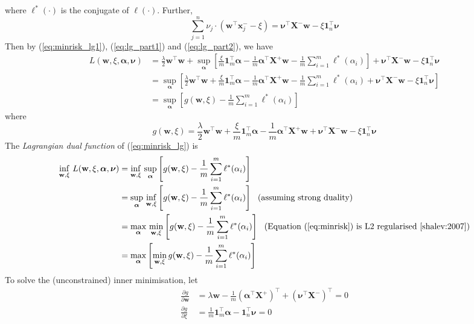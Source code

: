 \documentclass[9pt]{extarticle}
\newcommand{\x}{\mathbf{x}}
\newcommand{\1}{\mathbf{1}}
\newcommand{\w}{\mathbf{w}}
\newcommand{\X}{\mathbf{X}}
\newcommand{\alphabm}{\bm{\alpha}}
\newcommand{\nubm}{\bm{\nu}}
\begin{document}
where $\ell^*(\cdot)$ is the conjugate of $\ell(\cdot)$.
Further, 
\begin{equation}
\label{eq:lg_part2}
\sum_{j=1}^n \nu_j \cdot \left( \w^\top \x_j^- - \xi \right) = \nubm^\top \X^- \w - \xi \1_n^\top \nubm
\end{equation}
Then by (\ref{eq:minrisk_lg1}), (\ref{eq:lg_part1}) and (\ref{eq:lg_part2}), we have
\begin{align*}
L(\w, \xi, \alphabm, \nubm) 
&= \frac{\lambda}{2} \w^\top \w + 
   \sup_{\alphabm} \left[ \frac{\xi}{m} \1_m^\top \alphabm - \frac{1}{m} \alphabm^\top \X^+ \w - \frac{1}{m} \sum_{i=1}^m \ell^*(\alpha_i) \right] +
   \nubm^\top \X^- \w - \xi \1_n^\top \nubm \\
&= \sup_{\alphabm} \left[ 
   \frac{\lambda}{2} \w^\top \w + 
   \frac{\xi}{m} \1_m^\top \alphabm - \frac{1}{m} \alphabm^\top \X^+ \w - \frac{1}{m} \sum_{i=1}^m \ell^*(\alpha_i) +
   \nubm^\top \X^- \w - \xi \1_n^\top \nubm \right] \\
&= \sup_{\alphabm} \left[ g(\w, \xi) - \frac{1}{m} \sum_{i=1}^m \ell^*(\alpha_i) \right]
\end{align*}
where
$$g(\w, \xi) = \frac{\lambda}{2} \w^\top \w + \frac{\xi}{m} \1_m^\top \alphabm - \frac{1}{m} \alphabm^\top \X^+ \w + \nubm^\top \X^- \w - \xi \1_n^\top \nubm$$
The \emph{Lagrangian dual function} of (\ref{eq:minrisk_lg}) is
\begin{equation}
\label{eq:lg_dual_func}
\begin{aligned}
\inf_{\w, \xi} \, L(\w, \xi, \alphabm, \nubm) 
&= \inf_{\w, \xi}  \, \sup_{\alphabm} \left[ g(\w, \xi) - \frac{1}{m} \sum_{i=1}^m \ell^*(\alpha_i) \right] \\
&= \sup_{\alphabm} \, \inf_{\w, \xi} \left[ g(\w, \xi) - \frac{1}{m} \sum_{i=1}^m \ell^*(\alpha_i) \right] ~~ \text{(assuming strong duality)} \\
&= \max_{\alphabm} \, \min_{\w, \xi} \left[ g(\w, \xi) - \frac{1}{m} \sum_{i=1}^m \ell^*(\alpha_i) \right] ~~ \text{(Equation (\ref{eq:minrisk}) is L2 regularised~\cite{shalev:2007})} \\
&= \max_{\alphabm} \left[ \min_{\w, \xi} g(\w, \xi) - \frac{1}{m} \sum_{i=1}^m \ell^*(\alpha_i) \right]
\end{aligned}
\end{equation}
To solve the (unconstrained) inner minimisation, let
\begin{align*}
\frac{\partial g}{\partial \w}  &= \lambda \w - \frac{1}{m} \left( \alphabm^\top \X^+ \right)^\top + \left( \nubm^\top \X^- \right)^\top = 0 \\
\frac{\partial g}{\partial \xi} &= \frac{1}{m} \1_m^\top \alphabm - \1_n^\top \nubm = 0
\end{align*}
\end{document}

